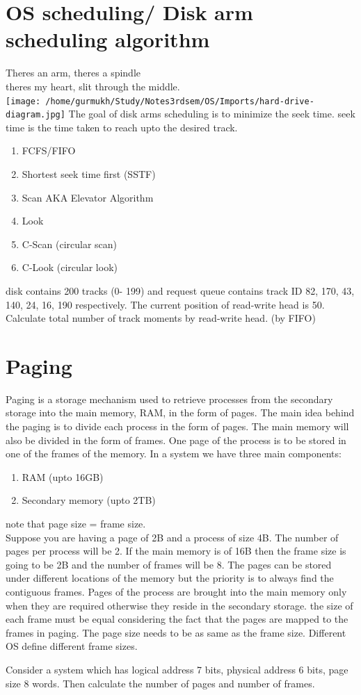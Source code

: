 \documentclass[12pt,letterpaper]{article}
\newenvironment{problem}[2][Problem]                                  
        {\begin{tcolorbox}[colback=white,colframe=gray!50,title=#1 #2]}
        {\end{tcolorbox}}
\begin{document}
  \section{OS scheduling/ Disk arm scheduling algorithm}
  Theres an arm, theres a spindle \\
  theres my heart, slit through the middle.\\
  \texttt{[image: /home/gurmukh/Study/Notes3rdsem/OS/Imports/hard-drive-diagram.jpg]}
  The goal of disk arms scheduling is to minimize the seek time. seek time is the time taken to reach upto the desired track. 
  \begin{enumerate}
    \item FCFS/FIFO
    \item Shortest seek time first (SSTF)
    \item Scan AKA Elevator Algorithm
    \item Look
    \item C-Scan (circular scan)
    \item C-Look (circular look)
  \end{enumerate}
  \begin{problem}
  A disk contains 200 tracks (0- 199) and request queue contains track ID 82, 170,  43, 140, 24, 16, 190 respectively. The current position of read-write head is 50. Calculate total number of track moments by read-write head. (by FIFO)
  \end{problem}
  \section{Paging}
  Paging is a storage mechanism used to retrieve processes from the secondary storage into the main memory, RAM, in the form of pages. The main idea behind the paging is to divide each process in the form of pages. The main memory will also be divided in the form of frames. One page of the process is to be stored in one of the frames of the memory.
  In a system we have three main components: 
  \begin{enumerate}
    \item RAM (upto 16GB)
    \item Secondary memory (upto 2TB)
  \end{enumerate}
  note that page size = frame size.\\
  Suppose you are having a page of 2B and a process of size 4B. The number of pages per process will be 2. If the main memory is of 16B then the frame size is going to be 2B and the number of frames will be 8. 
  The pages can be stored under different locations of the memory but the priority is to always find the contiguous frames. Pages of the process are brought into the main memory only when they are required otherwise they reside in the secondary storage. the size of each frame must be equal considering the fact that the pages are mapped to the frames in paging. The page size needs to be as same as the frame size. Different OS define different frame sizes. 
  \begin{problem}A
    Consider a system which has logical address 7 bits, physical address 6 bits, page size 8 words. Then calculate the number of pages and number of frames. 
  \end{problem}
\end{document}
